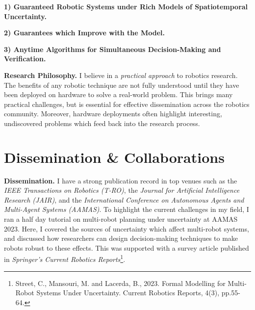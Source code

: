\documentclass[12pt]{article}
\begin{document}
\vspace*{1ex}\noindent\textbf{1) Guaranteed Robotic Systems under Rich Models of Spatiotemporal Uncertainty.}

\vspace*{1ex}\noindent\textbf{2) Guarantees which Improve with the Model.}

\vspace*{1ex}\noindent\hypertarget{topicthree}{\textbf{3) Anytime Algorithms for Simultaneous Decision-Making and Verification.}}

\vspace*{1ex}\noindent\textbf{Research Philosophy.} I believe in a \emph{practical approach} to robotics research.
%
The benefits of any robotic technique are not fully understood until they have been deployed on hardware to solve a real-world problem.
%
This brings many practical challenges, but is essential for effective dissemination across the robotics community.
%
Moreover, hardware deployments often highlight interesting, undiscovered problems which feed back into the research process.

\section*{Dissemination \& Collaborations}

\vspace*{1ex}\noindent\textbf{Dissemination.} I have a strong publication record in top venues such as the \emph{IEEE Transactions on Robotics (T-RO)}, the \emph{Journal for Artificial Intelligence Research (JAIR)}, and the \emph{International Conference on Autonomous Agents and Multi-Agent Systems (AAMAS)}.
%
To highlight the current challenges in my field, I ran a half day tutorial on multi-robot planning under uncertainty at AAMAS 2023.
%
Here, I covered the sources of uncertainty which affect multi-robot systems, and discussed how researchers can design decision-making techniques to make robots robust to these effects.
%
This was supported with a survey article published in \emph{Springer's Current Robotics Reports}\footnote{Street, C., Mansouri, M. and Lacerda, B., 2023. Formal Modelling for Multi-Robot Systems Under Uncertainty. Current Robotics Reports, 4(3), pp.55-64.}.
\end{document}
